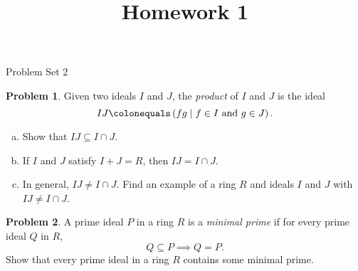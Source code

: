 \documentclass[11pt]{article}
\title{}
\date{\vspace{-0.5in}}
\title{Homework 1}
\theoremstyle{definition}
\newtheorem{problem}{Problem}
\begin{document}
\thispagestyle{fancy}
\pagestyle{fancy}


\begin{center}
	{\LARGE Problem Set 2}
\end{center}



\begin{problem}
Given two ideals $I$ and $J$, the \emph{product} of $I$ and $J$ is the ideal
$$IJ \colonequals \left( fg \mid f \in I \textrm{ and } g \in J \right) .$$
\begin{enumerate}[a)]
	\item Show that $IJ \subseteq I \cap J$.
	\item If $I$ and $J$ satisfy $I+J = R$, then $IJ = I \cap J$.
	\item In general, $IJ \neq I \cap J$. Find an example of a ring $R$ and ideals $I$ and $J$ with $IJ \neq I \cap J$.
\end{enumerate}
\end{problem}

\vfill

\begin{problem}
	A prime ideal $P$ in a ring $R$ is a \emph{minimal prime} if for every prime ideal $Q$ in $R$, 
	$$Q \subseteq P \implies Q = P.$$
\vspace{-0.5em}
	Show that every prime ideal in a ring $R$ contains some minimal prime.
\end{problem}

\vfill
\vspace{1em}

\noindent
{} 

\vspace{1em}
\end{document}
